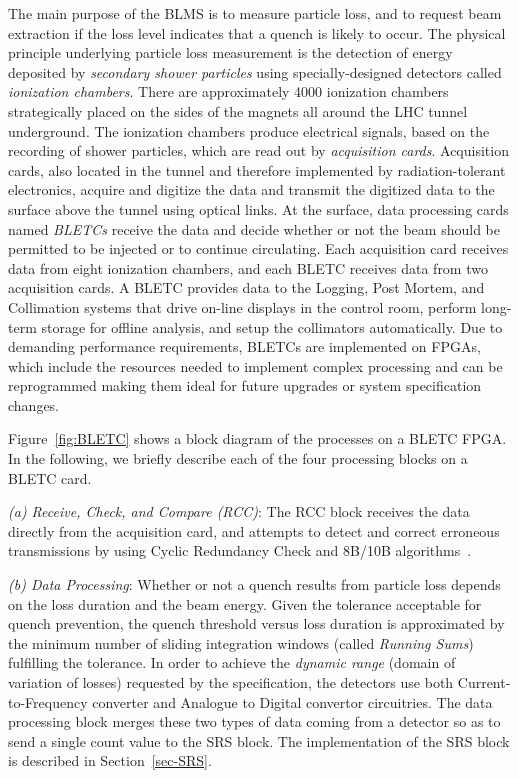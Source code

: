 \documentclass{llncs}
\begin{document}
The main purpose of the BLMS is to measure particle loss, and to request beam extraction if the loss level indicates that a quench is likely to occur.
The physical principle underlying particle loss measurement \cite{Dehning-IPAC,Chris-FPGA} is the detection of energy deposited by \emph{secondary shower particles} using specially-designed detectors called  \emph{ionization chambers}.
There are approximately 4000 ionization chambers strategically placed on the sides of the magnets all around the LHC tunnel underground.
The ionization chambers produce electrical signals, based on the recording of shower particles, which are read out by \emph{acquisition cards}.
Acquisition cards, also located in the tunnel and therefore implemented by radiation-tolerant electronics, acquire and digitize the data and transmit the digitized data to the surface above the tunnel using optical links.
At the surface, data processing cards named \emph{BLETCs} receive the data and decide whether or not the beam should be permitted to be injected or to continue circulating.
Each acquisition card receives data from eight ionization chambers, and each BLETC receives data from two acquisition cards.
A BLETC provides data to the Logging, Post Mortem, and Collimation systems that drive on-line displays in the control room, perform long-term storage for offline analysis, and setup the collimators automatically.
Due to demanding performance requirements, BLETCs are implemented on FPGAs, which include the resources needed to implement complex processing and can be reprogrammed making them ideal for future upgrades or system specification changes.

Figure~\ref{fig:BLETC} shows a block diagram of the processes on a BLETC FPGA.
In the following, we briefly describe each of the four processing blocks on a BLETC card.

\emph{(a) Receive, Check, and Compare (RCC)}: The RCC block receives the data directly from the acquisition card, and attempts to detect and correct erroneous transmissions by using Cyclic Redundancy Check and 8B/10B algorithms~\cite{CRC,8B10B}.

\emph{(b) Data Processing}: Whether or not a quench results from particle loss depends on the loss duration and the beam energy.
Given the tolerance acceptable for quench prevention, the quench threshold versus loss duration is approximated by the minimum number of sliding integration windows (called \emph{Running Sums}) fulfilling the tolerance.
In order to achieve the \emph{dynamic range} (domain of variation of losses) requested by the specification, the detectors use both Current-to-Frequency converter and Analogue to Digital convertor circuitries.
The data processing block merges these two types of data coming from a detector so as to send a single count value to the SRS block.
The implementation of the SRS block is described in Section~\ref{sec-SRS}.
\end{document}
